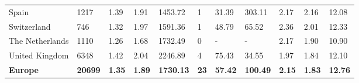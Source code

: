 \begin{tabular}{lllllllllll}
  Spain & 1217 & 1.39 & 1.91 & 1453.72 & 1 & 31.39 & 303.11 & 2.17 & 2.16 & 12.08 \\ 
  Switzerland & 746 & 1.32 & 1.97 & 1591.36 & 1 & 48.79 & 65.52 & 2.36 & 2.01 & 12.33 \\ 
  The Netherlands & 1110 & 1.26 & 1.68 & 1732.49 & 0 & - & - & 2.17 & 1.90 & 10.90 \\ 
  United Kingdom & 6348 & 1.42 & 2.04 & 2246.89 & 4 & 75.43 & 34.55 & 1.97 & 1.84 & 12.10 \\ 
  \textbf{Europe} & \textbf{20699} & \textbf{1.35} & \textbf{1.89} & \textbf{1730.13} & \textbf{23} & \textbf{57.42} & \textbf{100.49} & \textbf{2.15} & \textbf{1.83} & \textbf{12.76} \\ 
   \bottomrule
\end{tabular}
